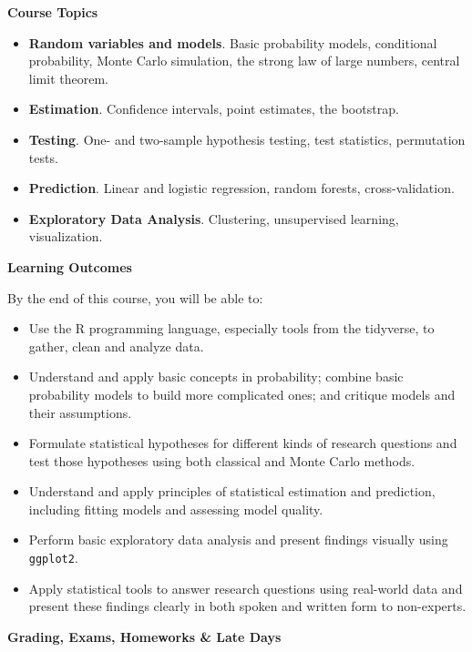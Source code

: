 \documentclass[11pt,oneside]{amsart}
\newcommand{\header}[1]{\bigbreak\textbf{#1}}
\begin{document}
\header{Course Topics}

\begin{itemize}
\item {\bf Random variables and models}. Basic probability models, conditional probability, Monte Carlo simulation, the strong law of large numbers, central limit theorem.
\item {\bf Estimation}. Confidence intervals, point estimates, the bootstrap.
\item {\bf Testing}. One- and two-sample hypothesis testing, test statistics, permutation tests.
\item {\bf Prediction}. Linear and logistic regression, random forests, cross-validation.
\item {\bf Exploratory Data Analysis}. Clustering, unsupervised learning, visualization.
\end{itemize}

\header{Learning Outcomes}

By the end of this course, you will be able to:
\begin{itemize}
\item Use the R programming language, especially tools from the tidyverse, to gather, clean and analyze data.
\item Understand and apply basic concepts in probability; combine basic probability models to build more complicated ones; and critique models and their assumptions.
\item Formulate statistical hypotheses for different kinds of research questions and test those hypotheses using both classical and Monte Carlo methods.
\item Understand and apply principles of statistical estimation and prediction, including fitting models and assessing model quality.
\item Perform basic exploratory data analysis and present findings visually using {\tt ggplot2}.
\item Apply statistical tools to answer research questions using real-world data and present these findings clearly in both spoken and written form to non-experts.
\end{itemize}

\header{Grading, Exams, Homeworks \& Late Days}
\end{document}
